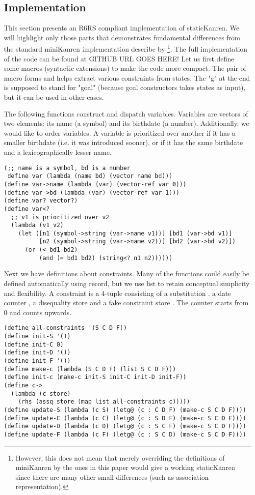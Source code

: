 \subsection{Implementation}
This section presents an R6RS compliant implementation of staticKanren. We will highlight only those parts that demonstrates fundamental differences from the standard miniKanren implementation describe by \textcite{byrdphd}\footnote{However, this does not mean that merely overriding the definitions of miniKanren by the ones in this paper would give a working staticKanren since there are many other small differences (such as association representation).}. The full implementation of the code can be found at GITHUB URL GOES HERE!
Let us first define some macros (syntactic extensions) to make the code more compact. The pair of macro forms  and  helps extract various constraints from states. The "g" at the end is supposed to stand for "goal" (because goal constructors takes states as input), but it can be used in other cases.

The following functions construct and dispatch variables. Variables are vectors of two elements: its name (a symbol) and its birthdate (a number). Additionally, we would like to order variables. A variable is prioritized over another if it has a smaller birthdate (i.e. it was introduced sooner), or if it has the same birthdate and a lexicographically lesser name.
\begin{lstlisting}
(;; name is a symbol, bd is a number
 define var (lambda (name bd) (vector name bd)))
(define var->name (lambda (var) (vector-ref var 0)))
(define var->bd (lambda (var) (vector-ref var 1)))
(define var? vector?)
(define var<?
  ;; v1 is prioritized over v2
  (lambda (v1 v2)
    (let ([n1 (symbol->string (var->name v1))] [bd1 (var->bd v1)]
          [n2 (symbol->string (var->name v2))] [bd2 (var->bd v2)])
      (or (< bd1 bd2)
          (and (= bd1 bd2) (string<? n1 n2))))))
\end{lstlisting}

Next we have definitions about constraints. Many of the functions could easily be defined automatically using record, but we use list to retain conceptual simplicity and flexibility. A constraint is a 4-tuple consisting of a substitution , a date counter , a disequality store  and a fake constraint store . The counter starts from 0 and counts upwards.
\begin{lstlisting}
(define all-constraints '(S C D F))
(define init-S '())
(define init-C 0)
(define init-D '())
(define init-F '())
(define make-c (lambda (S C D F) (list S C D F)))
(define init-c (make-c init-S init-C init-D init-F))
(define c->
  (lambda (c store)
    (rhs (assq store (map list all-constraints c)))))
(define update-S (lambda (c S) (letg@ (c : C D F) (make-c S C D F))))
(define update-C (lambda (c C) (letg@ (c : S D F) (make-c S C D F))))
(define update-D (lambda (c D) (letg@ (c : S C F) (make-c S C D F))))
(define update-F (lambda (c F) (letg@ (c : S C D) (make-c S C D F))))
\end{lstlisting}

